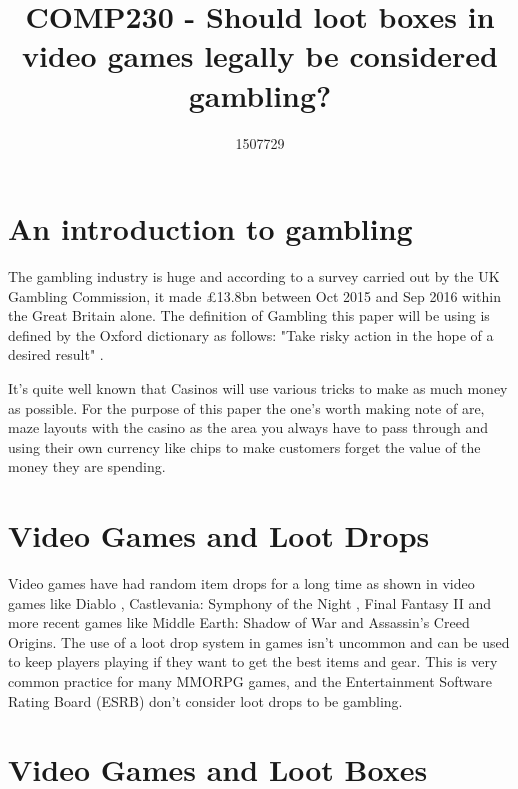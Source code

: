 \documentclass{scrartcl}
\title{COMP230 - Should loot boxes in video games legally be considered gambling?}
\author{1507729}
\begin{document}
\maketitle

\section{An introduction to gambling}
The gambling industry is huge and according to a survey carried out by the UK Gambling Commission, it made £13.8bn between Oct 2015 and Sep 2016 within the Great Britain alone. \cite{GamCom2017Stats} The definition of Gambling this paper will be using is defined by the Oxford dictionary as follows: "Take risky action in the hope of a desired result" \cite{Oxford2017Gamble}. 

It's quite well known that Casinos will use various tricks to make as much money as possible. \cite{Casino2014design, Libby2014Tricks} For the purpose of this paper the one's worth making note of are, maze layouts with the casino as the area you always have to pass through and using their own currency like chips to make customers forget the value of the money they are spending.

\section{Video Games and Loot Drops}
Video games have had random item drops for a long time as shown in video games like Diablo \cite{Blizzard1996Diablo}, Castlevania: Symphony of the Night \cite{Konami1997Castlevania}, Final Fantasy II \cite{Square1988Final}and more recent games like Middle Earth: Shadow of War \cite{Monolith2017Middle} and Assassin's Creed Origins. \cite{Ubisoft2017Assassin} The use of a loot drop system in games isn't uncommon and can be used to keep players playing if they want to get the best items and gear. This is very common practice for many MMORPG games, and the Entertainment Software Rating Board (ESRB) don't consider loot drops to be gambling.

\section{Video Games and Loot Boxes}
\end{document}
